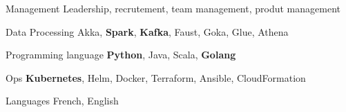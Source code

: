 

\begin{cvskills}
\cvskill
  {Management} %
  {Leadership, recrutement, team management, produt management} %

  \cvskill
    {Data Processing} %
    {Akka, \textbf{Spark}, \textbf{Kafka}, Faust, Goka, Glue, Athena} %

  \cvskill
    {Programming language} %
    {\textbf{Python}, Java, Scala, \textbf{Golang}} %

  \cvskill
    {Ops} %
    {\textbf{Kubernetes}, Helm, Docker, Terraform, Ansible, CloudFormation} %

  \cvskill
    {Languages} %
    {French, English} %

\end{cvskills}
